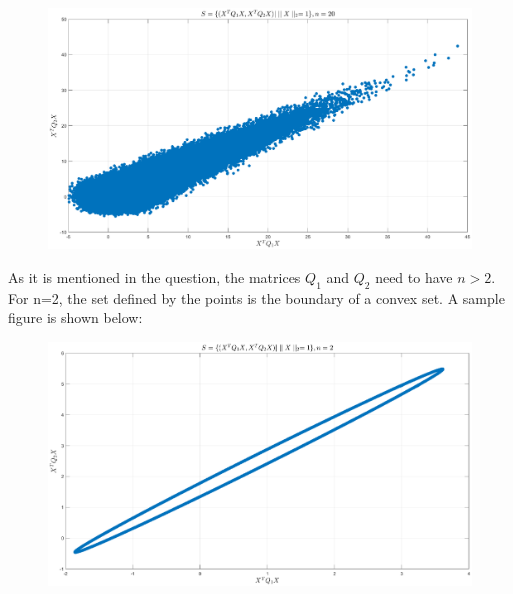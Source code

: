 \documentclass[a4paper]{article}
\begin{document}
\begin{Large}
\begin{figure}[!h]
\begin{center}
			\includegraphics[scale=.45]{q120}
		\end{center}
	\end{figure}
\newpage
	As it is mentioned in the question, the matrices $ Q_1 $ and $ Q_2 $ need to have $ n>2 $. For n=2, the set defined by the points is the boundary of a convex set. A sample figure is shown below:
		\begin{figure}[!h]
		\begin{center}
			\includegraphics[scale=.45]{q12}
		\end{center}
	\end{figure}


	\newpage



\end{Large}
\end{document}
